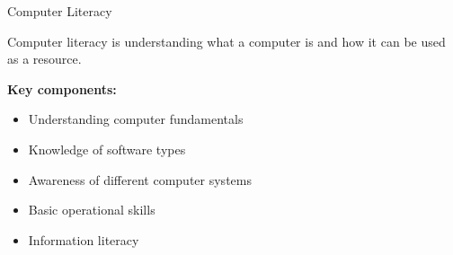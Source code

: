 \documentclass[aspectratio=169]{beamer}
\begin{document}
\begin{frame}{Computer Literacy}
  \begin{definition}
    Computer literacy is understanding what a computer is and how it can be
    used as a resource.
  \end{definition}
  \vspace{0.4cm}
  \textbf{Key components:}
  \begin{itemize}[<+->]
    \item Understanding computer fundamentals
    \item Knowledge of software types
    \item Awareness of different computer systems
    \item Basic operational skills
    \item Information literacy
  \end{itemize}
  \vspace{0.3cm}
\end{frame}
\end{document}

